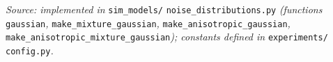 \documentclass[11pt]{article}
\begin{document}
\vspace{1em}
\begin{small}
\noindent\textit{Source: implemented in} \texttt{sim\_models/} \texttt{noise\_distributions.py}
\textit{(functions} \texttt{gaussian}\textit{,} \texttt{make\_mixture\_gaussian}\textit{,}
\texttt{make\_anisotropic\_gaussian}\textit{,} \texttt{make\_anisotropic\_mixture\_gaussian}\textit{);
constants defined in} \texttt{experiments/} \texttt{config.py}\textit{.}
\end{small}
\end{document}
